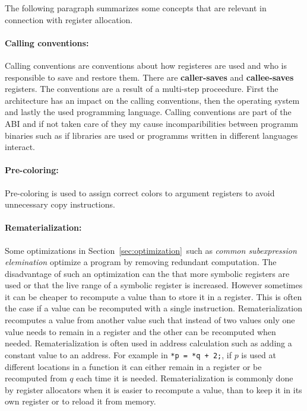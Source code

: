 \documentclass[a4paper,10pt]{article}
\begin{document}
The following paragraph summarizes some concepts that are relevant in connection with register allocation.

\paragraph{Calling conventions:} Calling conventions are conventions about how registeres are used and who is responsible to save and 
restore them. There are \textbf{caller-saves} and \textbf{callee-saves} registers. The conventions are a result of a multi-step 
proceedure. First the architecture has an impact on the calling conventions, then the operating system and lastly the used programming 
language. Calling conventions are part of the ABI and if not taken care of they my cause incomparibilities between programm binaries such 
as if libraries are used or programms written in different languages interact.

\paragraph{Pre-coloring:} Pre-coloring is used to assign correct colors to argument registers to avoid unnecessary copy instructions.

\paragraph{Rematerialization:} Some optimizations in Section\, \ref{sec:optimization}\, such as \textit{common subexpression
elemination} optimize a program by removing redundant computation. The disadvantage of such an optimization can the that more symbolic 
registers are used or that the live range of a symbolic register is increased. However sometimes it can be cheaper to recompute a value 
than to store it in a register. This is often the case if a value can be recomputed with a single instruction. Rematerialization 
recomputes a value from another value such that instead of two values only one value needs to remain in a register and the other can be 
recomputed when needed. Rematerialization is often used in address calculation such as adding a constant value to an address. For example 
in \lstinline|*p = *q + 2;|, if $p$ is used at different locations in a function it can either remain in a register or be recomputed
from $q$ each time it is needed. Rematerialization is commonly done by register allocators when it is easier to recompute a value, than
to keep it in its own register or to reload it from memory.
\end{document}
